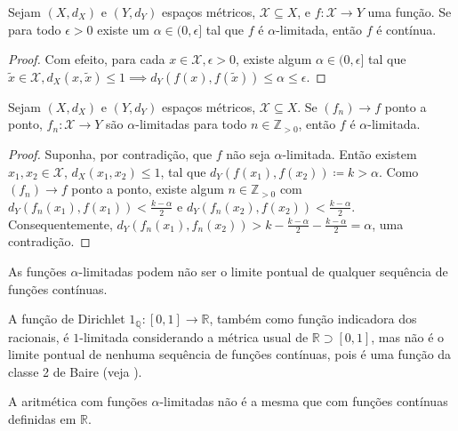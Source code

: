 \begin{theorem}
  Sejam $(X, d_X)$ e $(Y, d_Y)$ espaços métricos, $\mathcal{X} \subseteq X$, e $f : \mathcal{X} \to Y$ uma função. Se para todo $\epsilon > 0$ existe um $\alpha \in (0, \epsilon]$ tal que $f$ é $\alpha$-limitada, então $f$ é contínua.
\end{theorem}
\begin{proof}
  Com efeito, para cada $x \in \mathcal{X}, \epsilon > 0$, existe algum $\alpha \in (0, \epsilon]$ tal que $\tilde{x} \in \mathcal{X}, d_X(x, \tilde{x}) \le 1 \implies d_Y(f(x), f(\tilde{x})) \le \alpha \le \epsilon$.
\end{proof}

\begin{theorem}
  Sejam $(X, d_X)$ e $(Y, d_Y)$ espaços métricos, $\mathcal{X} \subseteq X$. Se $(f_n) \to f$ ponto a ponto, $f_n : \mathcal{X} \to Y$ são $\alpha$-limitadas para todo $n \in \mathbb{Z}_{> 0}$, então $f$ é $\alpha$-limitada.
\end{theorem}
\begin{proof}
  Suponha, por contradição, que $f$ não seja $\alpha$-limitada. Então existem $x_1, x_2 \in \mathcal{X}$, $d_X(x_1, x_2) \le 1$, tal que $d_Y(f(x_1), f(x_2)) \coloneqq k > \alpha$. Como $(f_n) \to f$ ponto a ponto, existe algum $n \in \mathbb{Z}_{> 0}$ com $d_Y(f_n(x_1), f(x_1)) < \frac{k - \alpha}{2}$ e $d_Y(f_n(x_2), f(x_2)) < \frac{k - \alpha}{2}$. Consequentemente, $d_Y(f_n(x_1), f_n(x_2)) > k - \frac{k - \alpha}{2} - \frac{k - \alpha}{2} = \alpha$, uma contradição.
\end{proof}

As funções $\alpha$-limitadas podem não ser o limite pontual de qualquer sequência de funções contínuas.

\begin{example}
  A função de Dirichlet $1_\mathbb{Q} : [0, 1] \to \mathbb{R}$, também como função indicadora dos racionais, é $1$-limitada considerando a métrica usual de $\mathbb{R} \supset [0, 1]$, mas não é o limite pontual de nenhuma sequência de funções contínuas, pois é uma função da classe 2 de Baire (veja \cite{baire}).
\end{example}

A aritmética com funções $\alpha$-limitadas não é a mesma que com funções contínuas definidas em $\mathbb{R}$.

